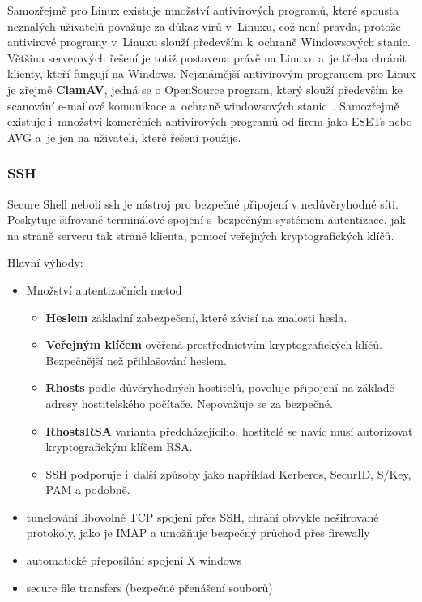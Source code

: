 \documentclass[a4paper,12pt]{article}
\renewcommand{\b}[1]{\textbf{#1}} %
\begin{document}
Samozřejmě pro Linux existuje množství antivirových programů, které spousta neznalých uživatelů považuje za důkaz virů v~Linuxu, což není pravda, protože antivirové programy v~Linuxu slouží především k~ochraně Windowsových stanic. Většina serverových řešení je totiž postavena právě na Linuxu a~je třeba chránit klienty, kteří fungují na Windows. Nejznámější antivirovým programem pro Linux je zřejmě \b{ClamAV}, jedná se o OpenSource program, který slouží především ke scanování e-mailové komunikace a~ochraně windowsových stanic~\cite{ClamAV}. Samozřejmě existuje i~množství komerčních antivirových programů od firem jako ESETs nebo AVG a~je jen na uživateli, které řešení použije.

\subsubsection{SSH}\label{sec:SSH}

Secure Shell neboli ssh je nástroj pro bezpečné připojení v nedůvěryhodné síti. Poskytuje šifrované terminálové spojení s~bezpečným systémem autentizace, jak na straně serveru tak straně klienta, pomocí veřejných kryptografických klíčů.

Hlavní výhody:
\begin{itemize}
 \item Množství autentizačních metod
\begin{itemize}
 \item \textbf{Heslem} základní zabezpečení, které závisí na znalosti hesla.
 \item \textbf{Veřejným klíčem} ověřená prostřednictvím kryptografických klíčů. Bezpečnější než přihlašování heslem.
 \item \textbf{Rhosts} podle důvěryhodných hostitelů, povoluje připojení na základě adresy hostitelského počítače. Nepovažuje se za bezpečné.
 \item \textbf{RhostsRSA} varianta předcházejícího, hostitelé se navíc musí autorizovat kryptografickým klíčem RSA.
 \item SSH podporuje i~další způsoby jako například Kerberos, SecurID, S/Key, PAM a podobně.
\end{itemize}
 \item tunelování libovolné TCP spojení přes SSH, chrání obvykle nešifrované protokoly, jako je IMAP a umožňuje bezpečný průchod přes firewally
 \item automatické přeposílání spojení X windows
 \item secure file transfers (bezpečné přenášení souborů)
\end{itemize}
\end{document}
